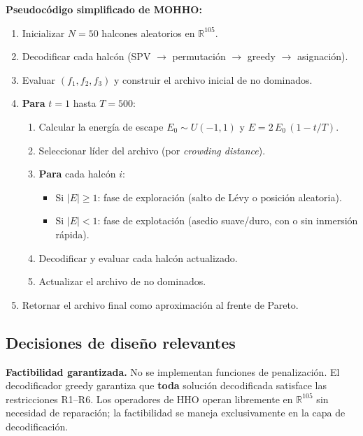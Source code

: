\documentclass[12pt,letterpaper]{article}
\begin{document}
\begin{resultbox}
\textbf{Pseudocódigo simplificado de MOHHO:}

\begin{enumerate}
    \item Inicializar $N = 50$ halcones aleatorios en $\mathbb{R}^{105}$.
    \item Decodificar cada halcón (SPV $\to$ permutación $\to$ greedy $\to$ asignación).
    \item Evaluar $(f_1, f_2, f_3)$ y construir el archivo inicial de no dominados.
    \item \textbf{Para} $t = 1$ hasta $T = 500$:
    \begin{enumerate}
        \item Calcular la energía de escape $E_0 \sim U(-1, 1)$ y $E = 2\,E_0\,(1 - t/T)$.
        \item Seleccionar líder del archivo (por \textit{crowding distance}).
        \item \textbf{Para} cada halcón $i$:
        \begin{itemize}
            \item Si $|E| \geq 1$: fase de exploración (salto de Lévy o posición aleatoria).
            \item Si $|E| < 1$: fase de explotación (asedio suave/duro, con o sin inmersión rápida).
        \end{itemize}
        \item Decodificar y evaluar cada halcón actualizado.
        \item Actualizar el archivo de no dominados.
    \end{enumerate}
    \item Retornar el archivo final como aproximación al frente de Pareto.
\end{enumerate}
\end{resultbox}

\subsection{Decisiones de diseño relevantes}

\begin{yellowbox}
\textbf{Factibilidad garantizada.} No se implementan funciones de penalización. El decodificador greedy garantiza que \textbf{toda} solución decodificada satisface las restricciones R1--R6. Los operadores de HHO operan libremente en $\mathbb{R}^{105}$ sin necesidad de reparación; la factibilidad se maneja exclusivamente en la capa de decodificación.
\end{yellowbox}
\end{document}
